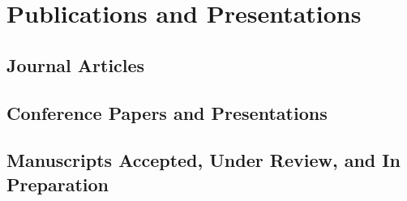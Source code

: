 \section{Publications and Presentations}

\newrefsection\nocite{*}
\subsection{Journal Articles}
\printbibliography[heading=none,type=article]

\newrefsection\nocite{*}
\subsection{Conference Papers and Presentations}
\printbibliography[heading=none, type=inproceedings]

\newrefsection\nocite{*}
\subsection{Manuscripts Accepted, Under Review, and In Preparation}
\printbibliography[heading=none,type=unpublished]


